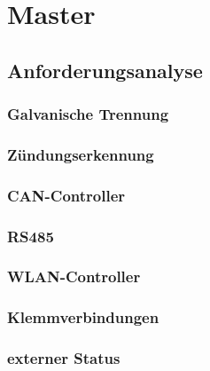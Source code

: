 \chapter{Master}


\section{Anforderungsanalyse}

\subsection{Galvanische Trennung}

\subsection{Zündungserkennung}

\subsection{CAN-Controller}

\subsection{RS485}

\subsection{WLAN-Controller}

\subsection{Klemmverbindungen}

\subsection{externer Status}